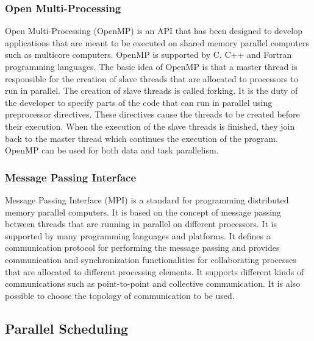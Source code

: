\subsubsection{Open Multi-Processing}
Open Multi-Processing (OpenMP) \cite{openmp} is an API that has been designed to develop applications that are meant to be executed on shared memory parallel computers such as multicore computers. OpenMP is supported by C, C++ and Fortran programming languages. The basic idea of OpenMP is that a master thread is responsible for the creation of slave threads that are allocated to processors to run in parallel. The creation of slave threads is called forking. It is the duty of the developer to specify parts of the code that can run in parallel using preprocessor directives. These directives cause the threads to be created before their execution. When the execution of the slave threads is finished, they join back to the master thread which continues the execution of the program. OpenMP can be used for both data and task parallelism.

\subsubsection{Message Passing Interface}
Message Passing Interface (MPI) \cite{mpi} is a standard for programming distributed memory parallel computers. It is based on the concept of message passing between threads that are running in parallel on different processors. It is supported by many programming languages and platforms. It defines a communication protocol for performing the message passing and provides communication and synchronization functionalities for collaborating processes that are allocated to different processing elements. It supports different kinds of communications such as point-to-point and collective communication. It is also possible to choose the topology of communication to be used.

\subsection{Parallel Scheduling}

